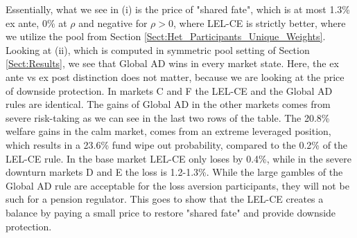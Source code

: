 \documentclass[11pt,a4paper]{article}
\theoremstyle{definition}
\theoremstyle{plain}
\theoremstyle{remark}
\newcommand{\1}{\mathbf{1}}
\begin{document}
Essentially, what we see in (i) is the price of "shared fate", which is at most 1.3\% ex ante, 0\% at $\rho$ and negative for $\rho>0$, where LEL-CE is strictly better, where we utilize the pool from Section \ref{Sect:Het_Participants_Unique_Weights}. Looking at (ii), which is computed in symmetric pool setting of Section \ref{Sect:Results}, we see that Global AD wins in every market state. Here, the ex ante vs ex post distinction does not matter, because we are looking at the price of downside protection. In markets C and F the LEL-CE and the Global AD rules are identical. The gains of Global AD in the other markets comes from severe risk-taking as we can see in the last two rows of the table. The 20.8\% welfare gains in the calm market, comes from an extreme leveraged position, which results in a 23.6\% fund wipe out probability, compared to the 0.2\% of the LEL-CE rule. In the base market LEL-CE only loses by 0.4\%, while in the severe downturn markets D and E the loss is 1.2-1.3\%. While the large gambles of the Global AD rule are acceptable for the loss aversion participants, they will not be such for a pension regulator. This goes to show that the LEL-CE creates a balance by paying a small price to restore "shared fate" and provide downside protection.
\end{document}
